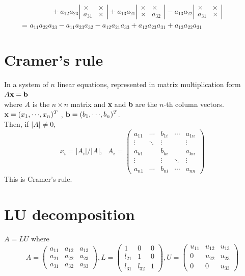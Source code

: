 \documentclass[dvipdfmx]{article}
\begin{document}
 \[
   \ \ \ \ \ \ + a_{12} a_{23}
  \left|
    \begin{array}{ccc}
      \times & \times \\
      a_{31} & \times
    \end{array}
  \right| 
  + a_{13} a_{21}
    \left|
    \begin{array}{ccc}
      \times & \times \\
      \times & a_{32} 
    \end{array}
  \right|
    - a_{13} a_{22}
    \left|
    \begin{array}{ccc}
      \times & \times \\
      a_{31} & \times 
    \end{array}
  \right|
\]
\ \ \ \ \ = $a_{11}a_{22}a_{33} - a_{11}a_{23}a_{32} - a_{12}a_{21}a_{33} + a_{12}a_{23}a_{31} + a_{13}a_{22}a_{31}$


\section*{Cramer's rule}
In a system of $n$ linear equations, represented in matrix multiplication form
$A{\bf{x}} = {\bf{b}}$ \\
where $A$ is the $n {\times} n$ matrix and {\bf{x}} and {\bf{b}} are the $n$-th column vectors.
${\bf{x}} = (x_1, {\cdots}, x_n)^T$ , ${\bf{b}} = (b_1, {\cdots}, b_n)^T$. \\
Then, if $|A| {\neq} 0$,  \\
 \[
   x_i = |A_i| / |A|, \ \ \ 
   A_i =
   \left(
   \begin{array}{ccccc}
   a_{11} & \cdots & b_{1i} & \cdots & a_{1n} \\
   \vdots & \ddots  & \vdots & 	     &  \vdots \\
   a_{k1} &             & b_{ki} &           & a_{kn} \\
   \vdots &            & \vdots & \ddots  &  \vdots \\
   a_{n1} & \cdots & b_{ni} & \cdots &  a_{nn}
   \end{array}
   \right)
   \]
This is Cramer's rule.


\section*{LU decomposition}
$A = LU$ where
 \[
   A =
   \left(
   \begin{array}{ccc}
   a_{11} & a_{12} & a_{13} \\
   a_{21} & a_{22} & a_{23} \\
   a_{31} & a_{32} & a_{33} 
   \end{array}
   \right) ,
    L =
   \left(
   \begin{array}{ccc}
   1 & 0 & 0 \\
   l_{21} & 1 & 0 \\
   l_{31} & l_{32} & 1 
   \end{array}
   \right) ,
     U =
   \left(
   \begin{array}{ccc}
   u_{11} & u_{12} & u_{13} \\
   0         & u_{22} & u_{23} \\
   0         & 0         & u_{33} 
   \end{array}
   \right) 
  \]
\end{document}
